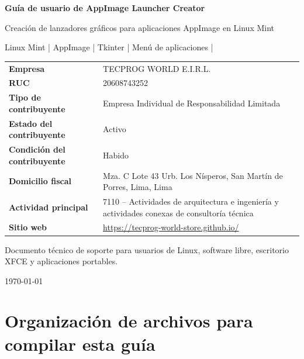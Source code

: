 \documentclass[11pt,a4paper]{article}
\begin{document}
\begin{titlepage}
    \centering
    \vspace*{1.2cm}

    {\Huge\bfseries\color{tecdark} Guía de usuario de AppImage Launcher Creator\par}

    \vspace{0.5cm}
    {\Large Creación de lanzadores gráficos para aplicaciones AppImage en Linux Mint\par}

    \vspace{1.0cm}
    {\large Linux Mint \quad | \quad AppImage \quad | \quad Tkinter \quad | \quad Menú de aplicaciones \quad | \par}

    \vfill

    \begin{tabular}{>{\bfseries}p{5.0cm}p{9.5cm}}
        Empresa & TECPROG WORLD E.I.R.L. \\
        RUC & 20608743252 \\
        Tipo de contribuyente & Empresa Individual de Responsabilidad Limitada \\
        Estado del contribuyente & Activo \\
        Condición del contribuyente & Habido \\
        Domicilio fiscal & Mza. C Lote 43 Urb. Los Nísperos, San Martín de Porres, Lima, Lima \\
        Actividad principal & 7110 -- Actividades de arquitectura e ingeniería y actividades conexas de consultoría técnica \\
        Sitio web & \url{https://tecprog-world-store.github.io/} \\
    \end{tabular}

    \vfill
    {\large Documento técnico de soporte para usuarios de Linux, software libre, escritorio XFCE y aplicaciones portables.\par}

    \vspace{0.8cm}
    {\large \today\par}
\end{titlepage}

\tableofcontents
\newpage

\section{Organización de archivos para compilar esta guía}
\end{document}
